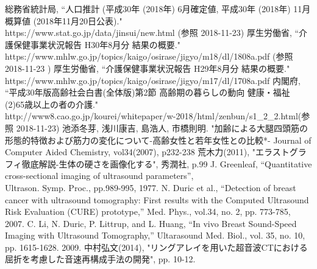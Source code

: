 \begin{thebibliography}{9}
   総務省統計局, 
    ``人口推計 (平成30年 (2018年) 6月確定値, 平成30年 (2018年) 11月概算値 (2018年11月20日公表)." \\https://www.stat.go.jp/data/jinsui/new.html  (参照 2018-11-23)
   厚生労働省,
    ``介護保健事業状況報告 H30年8月分 結果の概要." \\https://www.mhlw.go.jp/topics/kaigo/osirase/jigyo/m18/dl/1808a.pdf  (参照 2018-11-23 )
    厚生労働省,
    ``介護保健事業状況報告 H29年8月分 結果の概要." \\https://www.mhlw.go.jp/topics/kaigo/osirase/jigyo/m17/dl/1708a.pdf
     内閣府,
    ``平成30年版高齢社会白書(全体版)第2節 高齢期の暮らしの動向 健康・福祉 (2)65歳以上の者の介護."\\http://www8.cao.go.jp/kourei/whitepaper/w-2018/html/zenbun/s1\_2\_2.html(参照
    2018-11-23)
     池添冬芽, 浅川康吉, 島浩人, 市橋則明.
    "加齢による大腿四頭筋の形態的特徴および筋力の変化について-高齢女性と若年女性との比較*- Journal of Computer Aided Chemistry, vol34(2007), p232-238
      荒木力(2011), 
    "エラストグラフィ徹底解説-生体の硬さを画像化する", 秀潤社, p.99
     J. Greenleaf, 
    “Quantitative cross-sectional imaging of ultrasound parameters”, \\Ultrason. Symp. Proc., 
    pp.989-995, 1977.
     N. Duric et al.,
     “Detection of breast cancer with ultrasound tomography: First results with the Computed Ultrasound Risk Evaluation (CURE) prototype,” Med. Phys., vol.34, no. 2, pp. 773-785, 2007.
      C. Li, N. Duric, P. Littrup, and L. Huang, 
     “In vivo Breast Sound-Speed Imaging with Ultrasound Tomography,” Ultarasound Med. Biol., vol. 35, no. 10, pp. 1615-1628. 2009.
      中村弘文(2014), 
     "リングアレイを用いた超音波CTにおける屈折を考慮した音速再構成手法の開発", pp. 10-12.
\end{thebibliography}